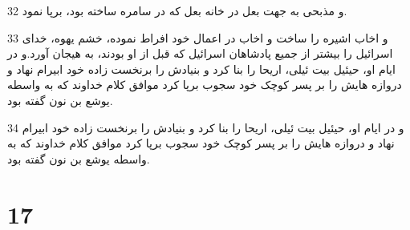 \par 32 و مذبحی به جهت بعل در خانه بعل که در سامره ساخته بود، برپا نمود.
\par 33 و اخاب اشیره را ساخت و اخاب در اعمال خود افراط نموده، خشم یهوه، خدای اسرائیل را بیشتر از جمیع پادشاهان اسرائیل که قبل از او بودند، به هیجان آورد.و در ایام او، حیئیل بیت ئیلی، اریحا را بنا کرد و بنیادش را برنخست زاده خود ابیرام نهاد و دروازه هایش را بر پسر کوچک خود سجوب برپا کرد موافق کلام خداوند که به واسطه یوشع بن نون گفته بود.
\par 34 و در ایام او، حیئیل بیت ئیلی، اریحا را بنا کرد و بنیادش را برنخست زاده خود ابیرام نهاد و دروازه هایش را بر پسر کوچک خود سجوب برپا کرد موافق کلام خداوند که به واسطه یوشع بن نون گفته بود.
 
\chapter{17}

